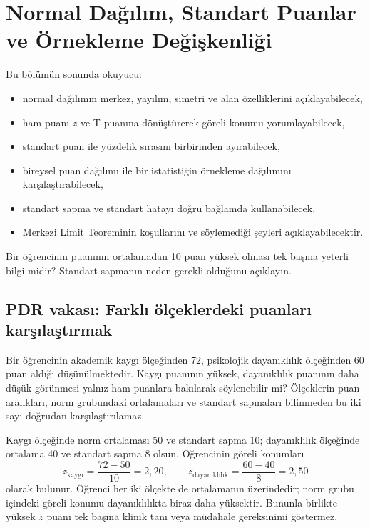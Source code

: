 \chapter{Normal Dağılım, Standart Puanlar ve Örnekleme Değişkenliği}

\begin{hedefler}
Bu bölümün sonunda okuyucu:
\begin{itemize}
  \item normal dağılımın merkez, yayılım, simetri ve alan özelliklerini açıklayabilecek,
  \item ham puanı $z$ ve T puanına dönüştürerek göreli konumu yorumlayabilecek,
  \item standart puan ile yüzdelik sırasını birbirinden ayırabilecek,
  \item bireysel puan dağılımı ile bir istatistiğin örnekleme dağılımını karşılaştırabilecek,
  \item standart sapma ve standart hatayı doğru bağlamda kullanabilecek,
  \item Merkezi Limit Teoreminin koşullarını ve söylemediği şeyleri açıklayabilecektir.
\end{itemize}
\end{hedefler}

\begin{hazirlik}
Bir öğrencinin puanının ortalamadan 10 puan yüksek olması tek başına yeterli
bilgi midir? Standart sapmanın neden gerekli olduğunu açıklayın.
\end{hazirlik}

\section{PDR vakası: Farklı ölçeklerdeki puanları karşılaştırmak}

Bir öğrencinin akademik kaygı ölçeğinden 72, psikolojik dayanıklılık ölçeğinden
60 puan aldığı düşünülmektedir. Kaygı puanının yüksek, dayanıklılık puanının
daha düşük görünmesi yalnız ham puanlara bakılarak söylenebilir mi? Ölçeklerin
puan aralıkları, norm grubundaki ortalamaları ve standart sapmaları bilinmeden
bu iki sayı doğrudan karşılaştırılamaz.

Kaygı ölçeğinde norm ortalaması 50 ve standart sapma 10; dayanıklılık ölçeğinde
ortalama 40 ve standart sapma 8 olsun. Öğrencinin göreli konumları
\[
z_{\text{kaygı}}=\frac{72-50}{10}=2{,}20,
\qquad
z_{\text{dayanıklılık}}=\frac{60-40}{8}=2{,}50
\]
olarak bulunur. Öğrenci her iki ölçekte de ortalamanın üzerindedir; norm grubu
içindeki göreli konumu dayanıklılıkta biraz daha yüksektir. Bununla birlikte
yüksek $z$ puanı tek başına klinik tanı veya müdahale gereksinimi göstermez.

